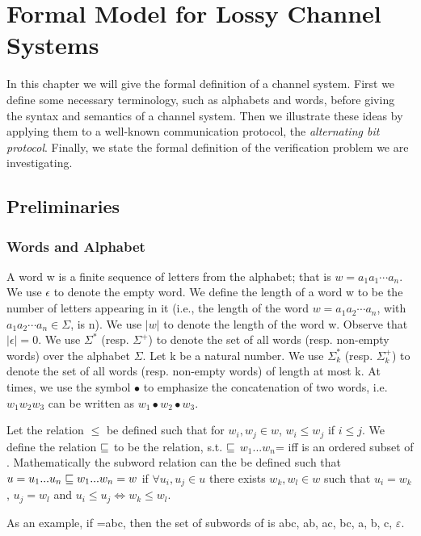 \section{Formal Model for Lossy Channel Systems}
\label{definitions}
In this chapter we will give the formal definition of a channel system. First we define some necessary terminology, such as alphabets and words, before giving the syntax and semantics of a channel system. Then we illustrate these ideas by applying them to a well-known communication protocol, the \emph{alternating bit protocol}. Finally, we state the formal definition of the verification problem we are investigating.

\subsection{Preliminaries}
\subsubsection{Words and Alphabet}
A word  w is a finite sequence of letters  from the alphabet; that is $ w=a_1 a_1 \cdots a_n$. We use $\epsilon$  to denote the empty word. We define the length  of a word  w to be the number of letters appearing in it (i.e., the length of the word $w=a_1 a_2 \cdots a_n$, with $a_1 a_2 \cdots a_n\in \Sigma$, is n). We use $|w|$ to denote the length of the word w. Observe that $|\epsilon|=0$. We use $\Sigma^*$  (resp. $\Sigma^+$) to denote the set of all  words (resp. non-empty words) over the alphabet $\Sigma$.  Let k be a natural number.  We use $\Sigma_k^*$  (resp. $\Sigma_k^+$) to denote the set of all  words (resp. non-empty words)  of length at most k. At times, we use the symbol $\bullet$ to emphasize the concatenation of two words, i.e. $w_1w_2w_3$ can be written as $w_1 \bullet w_2 \bullet w_3$.

Let the relation $\leq$ be defined such that for $w_i,w_j \in w$, $w_i\leq w_j$ if $i\leq j$. We define the relation $\sqsubseteq$ to be the  relation, s.t.  $\sqsubseteq$ $w_1...w_n$= iff  is an ordered subset of . Mathematically the subword relation can the be defined such that $u = u_1...u_n \sqsubseteq w_1...w_n = w$ if $\forall u_i, u_j \in u $ there exists $w_k, w_l \in w$ such that $u_i = w_k$, $u_j = w_l$ and $u_i \leq u_j \iff w_k \leq w_l$.

As an example, if =abc, then the set of subwords of  is {abc, ab, ac, bc, a, b, c, $\varepsilon$}.

